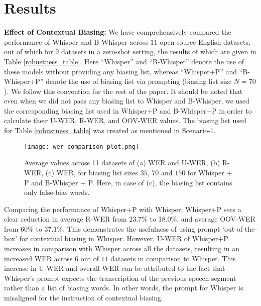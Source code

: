 \documentclass{article}
\begin{document}


\section{Results}

\textbf{Effect of Contextual Biasing: } We have comprehensively compared the performance of Whisper and B-Whisper across $11$ open-source English datasets, out of which for $9$ datasets in a zero-shot setting, the results of which are given in Table \ref{robustness_table}. Here ``Whisper'' and ``B-Whisper'' denote the use of these models without providing any biasing list, whereas ``Whisper+P'' and ``B-Whisper+P'' denote the use of biasing list via prompting (biasing list size $N=70$). We follow this convention for the rest of the paper. It should be noted that even when we did not pass any biasing list to Whisper and B-Whisper, we used the corresponding biasing list used in Whisper+P and B-Whisper+P in order to calculate their U-WER, R-WER, and OOV-WER values. The biasing list used for Table \ref{robustness_table} was created as mentioned in Scenario-1. 





 \begin{figure*}[t]
  \centering
  \texttt{[image: wer\_comparison\_plot.png]}
  \caption{Average values across 11 datasets of (a) WER and U-WER, (b) R-WER, (c) WER, for biasing list sizes $35$, $70$ and $150$ for Whisper + P and B-Whisper + P. Here, in case of (c), the biasing list contains only false-bias words.}
  \label{fig:prompt_lengths}
\end{figure*}

Comparing the performance of Whisper+P with Whisper, Whisper+P sees a clear reduction in average R-WER from $23.7\%$ to $18.0\%$, and average OOV-WER from $60\%$ to $37.1\%$. This demonstrates the usefulness of using prompt `out-of-the-box' for contextual biasing in Whisper. However, U-WER of Whisper+P increases in comparison with Whisper across all the datasets, resulting in an increased WER across $6$ out of $11$ datasets in  comparison to Whisper. This increase in U-WER and overall WER can be attributed to the fact that Whisper's prompt expects the transcription of the previous speech segment rather than a list of biasing words. In other words, the prompt for Whisper is misaligned for the instruction of contextual biasing. 
\end{document}
